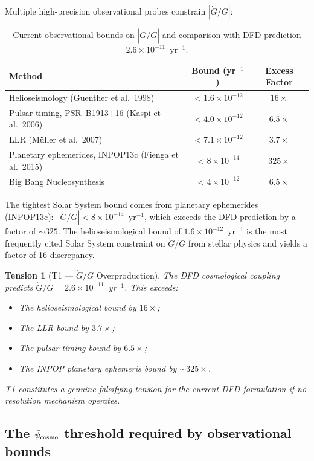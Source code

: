 \documentclass[aps,prd,twocolumn,superscriptaddress,nofootinbib,longbibliography]{revtex4-2}
\newcommand{\psibar}{\bar{\psi}}
\newcommand{\ee}[1]{\times 10^{#1}}
\newtheorem{tension}{Tension}
\begin{document}
Multiple high-precision observational probes constrain $|\dot{G}/G|$:

\begin{table}[h]
\caption{Current observational bounds on $|\dot{G}/G|$ and comparison with
DFD prediction $2.6\ee{-11}$~yr$^{-1}$.}
\label{tab:Gdot-bounds}
\begin{ruledtabular}
\begin{tabular}{lcc}
\textbf{Method} & \textbf{Bound (yr$^{-1}$)} & \textbf{Excess Factor}\\
\hline
Helioseismology (Guenther et al.\ 1998)
  & $< 1.6\ee{-12}$ & $16\times$\\
Pulsar timing, PSR~B1913+16 (Kaspi et al.\ 2006)
  & $< 4.0\ee{-12}$ & $6.5\times$\\
LLR (M\"{u}ller et al.\ 2007)
  & $< 7.1\ee{-12}$ & $3.7\times$\\
Planetary ephemerides, INPOP13c (Fienga et al.\ 2015)
  & $< 8\ee{-14}$ & $325\times$\\
Big Bang Nucleosynthesis
  & $< 4\ee{-12}$ & $6.5\times$\\
\end{tabular}
\end{ruledtabular}
\end{table}

The tightest Solar System bound comes from planetary ephemerides
(INPOP13c):~$|\dot{G}/G| < 8\ee{-14}$~yr$^{-1}$, which exceeds the DFD
prediction by a factor of $\sim\!325$.  The helioseismological bound of
$1.6\ee{-12}$~yr$^{-1}$ is the most frequently cited Solar System constraint
on $\dot{G}/G$ from stellar physics and yields a factor of 16 discrepancy.

\begin{tension}[T1 --- $\dot{G}/G$ Overproduction]
\label{ten:T1}
The DFD cosmological coupling predicts $\dot{G}/G = 2.6\ee{-11}$~yr$^{-1}$.
This exceeds:
\begin{itemize}
\item The helioseismological bound by $16\times$;
\item The LLR bound by $3.7\times$;
\item The pulsar timing bound by $6.5\times$;
\item The INPOP planetary ephemeris bound by $\sim\!325\times$.
\end{itemize}
T1 constitutes a genuine falsifying tension for the current DFD formulation
if no resolution mechanism operates.
\end{tension}

\subsection{The $\psibar_{\rm cosmo}$ threshold required by observational bounds}
\end{document}
